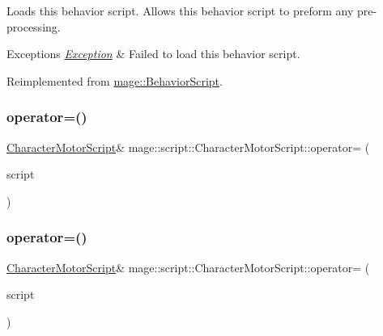 Loads this behavior script. Allows this behavior script to preform any pre-\/processing.


\begin{DoxyExceptions}{Exceptions}
{\em \hyperlink{classmage_1_1_exception}{Exception}} & Failed to load this behavior script. \\
\hline
\end{DoxyExceptions}


Reimplemented from \hyperlink{classmage_1_1_behavior_script_a06521eef472f2d878a9f652b95b723a8}{mage\+::\+Behavior\+Script}.

\hypertarget{classmage_1_1script_1_1_character_motor_script_ac0367e5e6fb8adfe3b9a962f1ca72b4c}{}\label{classmage_1_1script_1_1_character_motor_script_ac0367e5e6fb8adfe3b9a962f1ca72b4c} 
\subsubsection{\texorpdfstring{operator=()}{operator=()}\hspace{0.1cm}{\footnotesize\ttfamily [1/2]}}
{\footnotesize\ttfamily \hyperlink{classmage_1_1script_1_1_character_motor_script}{Character\+Motor\+Script}\& mage\+::script\+::\+Character\+Motor\+Script\+::operator= (\begin{DoxyParamCaption}\item[{const \hyperlink{classmage_1_1script_1_1_character_motor_script}{Character\+Motor\+Script} \&}]{script }\end{DoxyParamCaption})\hspace{0.3cm}{\ttfamily [delete]}}

\hypertarget{classmage_1_1script_1_1_character_motor_script_a00ca2aa38ca4a2557a783ffc31068801}{}\label{classmage_1_1script_1_1_character_motor_script_a00ca2aa38ca4a2557a783ffc31068801} 
\subsubsection{\texorpdfstring{operator=()}{operator=()}\hspace{0.1cm}{\footnotesize\ttfamily [2/2]}}
{\footnotesize\ttfamily \hyperlink{classmage_1_1script_1_1_character_motor_script}{Character\+Motor\+Script}\& mage\+::script\+::\+Character\+Motor\+Script\+::operator= (\begin{DoxyParamCaption}\item[{\hyperlink{classmage_1_1script_1_1_character_motor_script}{Character\+Motor\+Script} \&\&}]{script }\end{DoxyParamCaption})\hspace{0.3cm}{\ttfamily [delete]}}

